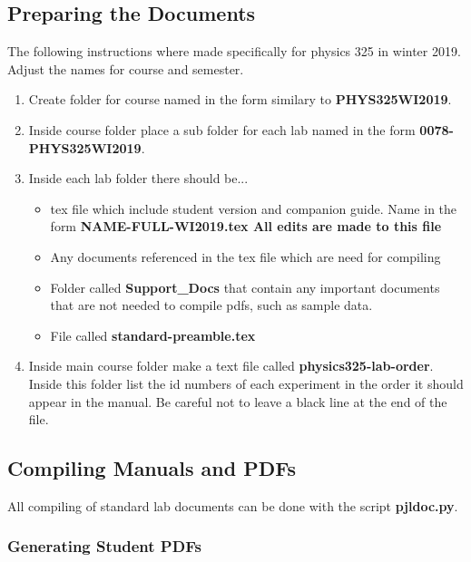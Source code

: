 \documentclass[justified]{pjlProcessDocs}
\begin{document}
\subsection{Preparing the Documents}

The following instructions where made specifically for physics 325 in winter 2019. Adjust the names for course and semester.

\begin{enumerate}
\item Create folder for course named in the form similary to {\bf PHYS325WI2019}.

\item Inside course folder place a sub folder for each lab named in the form {\bf 0078-PHYS325WI2019}.

\item Inside each lab folder there should be...
	\begin{itemize}
	\item tex file which include student version and companion 	guide. Name in the form { \bf NAME-FULL-WI2019.tex All edits are made to this file}
	\item Any documents referenced in the tex file which are need for compiling
	\item Folder called {\bf Support\_Docs} that contain any important documents that are not needed to compile pdfs, such as sample data.
	\item File called {\bf standard-preamble.tex}
	
	\end{itemize}
\item Inside main course folder make a text file called {\bf physics325-lab-order}. Inside this folder list the id numbers of each experiment in the order it should appear in the manual. Be careful not to leave a black line at the end of the file.
\end{enumerate}

\subsection{Compiling Manuals and PDFs}

All compiling of standard lab documents can be done with the script {\bf pjldoc.py}.

\subsubsection{Generating Student PDFs}
\end{document}
